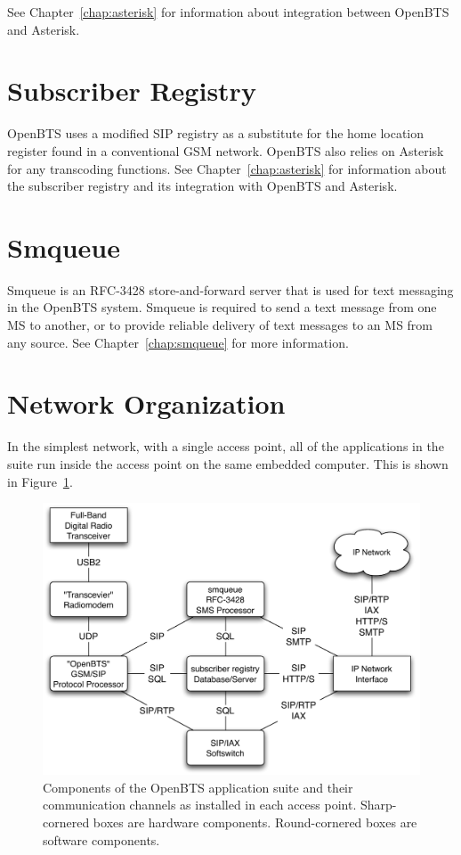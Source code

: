 \documentclass[11pt,openany]{book}
\begin{document}
See Chapter~\ref{chap:asterisk} for information about integration between OpenBTS and Asterisk. 

\section{Subscriber Registry}
OpenBTS uses a modified SIP registry as a substitute for the home location register found in a conventional GSM network.  OpenBTS also relies on Asterisk for any transcoding functions.  See Chapter~\ref{chap:asterisk} for information about the subscriber registry and its integration with OpenBTS and Asterisk.

\section{Smqueue}
Smqueue is an RFC-3428 store-and-forward server that is used for text messaging in the OpenBTS system.
Smqueue is required to send a text message from one MS to another, or to provide reliable delivery of text messages to an MS from any source.
See Chapter~\ref{chap:smqueue} for more information.

\section{Network Organization}
In the simplest network, with a single access point, all of the applications in the suite run inside the access point on the same embedded computer. 
This is shown in Figure~\ref{fig:insideTheNode}.



\begin{figure}[htbp]
\begin{center}
\includegraphics[width=\textwidth]{InsideTheNode.pdf}
\caption{Components of the OpenBTS application suite and their communication channels as installed in each access point.  Sharp-cornered boxes are hardware components.  Round-cornered boxes are software components.}
\label{fig:insideTheNode}
\end{center}
\end{figure}
\end{document}
